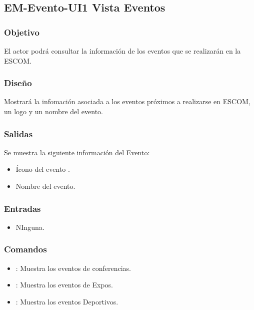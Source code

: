 


\pagebreak
\subsection{EM-Evento-UI1 Vista Eventos}

\subsubsection{Objetivo}
	El actor podrá consultar la información de los eventos que se realizarán en la ESCOM.

\subsubsection{Diseño}
	Mostrará la infomación asociada a los eventos próximos a realizarse en ESCOM, un logo y un nombre del evento. 


\subsubsection{Salidas}
	Se muestra la siguiente información del Evento:
	\begin{itemize}
		\item Ícono del evento .
	    \item Nombre del evento.
	\end{itemize}

\subsubsection{Entradas}

\begin{itemize}
	\item NInguna.
\end{itemize}

\subsubsection{Comandos}
\begin{itemize}
	
	\item {}: Muestra los eventos de conferencias.
	\item {}: Muestra los eventos de Expos.
	\item {}: Muestra los eventos Deportivos.
\end{itemize}

